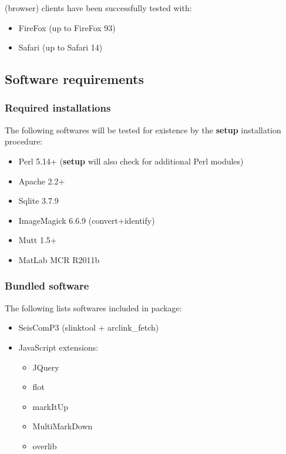 \webobs (browser) clients have been successfully tested with:
\begin{itemize}
\item   FireFox (up to FireFox 93)
\item   Safari (up to Safari 14)
\end{itemize}


\subsection{Software requirements}

\subsubsection{Required installations}

The following softwares will be tested for existence by the \textbf{setup} installation procedure:

\begin{itemize}
\item   Perl 5.14+ (\textbf{setup} will also check for additional Perl modules)
\item   Apache 2.2+
\item   Sqlite 3.7.9
\item   ImageMagick 6.6.9 (convert+identify)
\item   Mutt 1.5+
\item   MatLab MCR R2011b
\end{itemize}

\subsubsection{Bundled software}

The following lists softwares included in \webobs package:

\begin{itemize}
\item   SeisComP3 (slinktool + arclink\_fetch)
\item   JavaScript extensions:
\begin{itemize}
\item   JQuery
\item   flot
\item   markItUp
\item	MultiMarkDown
\item   overlib
\end{itemize}
\end{itemize}

